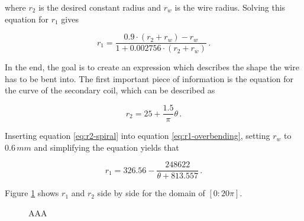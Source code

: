 where \(r_2\) is the desired constant radius and \(r_w\) is the wire radius. Solving this equation for \(r_1\) gives

\begin{equation}\label{eq:r1-overbending}
    r_1 = \frac{0.9 \cdot \left( r_2 + r_w \right) - r_w}{1 + 0.002756 \cdot \left(r_2 + r_w\right)}\,.
\end{equation}

In the end, the goal is to create an expression which describes the shape the wire has to be bent into. The first important piece of information is the equation for the curve of the secondary coil, which can be described as

\begin{equation}\label{eq:r2-spiral}
    r_2 = 25 + \frac{1.5}{\pi} \theta\,.
\end{equation}

Inserting equation \ref{eq:r2-spiral} into equation \ref{eq:r1-overbending}, setting \(r_w\) to \(0.6\,mm\) and simplifying the equation yields that

\begin{equation}
    r_1 = 326.56 - \frac{248622}{\theta + 813.557}\,.
\end{equation}

Figure \ref{fig:spirals} shows \(r_1\) and \(r_2\) side by side for the domain of \([0:20\pi]\).

\begin{figure}[h!]
    \centering
    \caption{AAA}
    \label{fig:spirals}
\end{figure}

